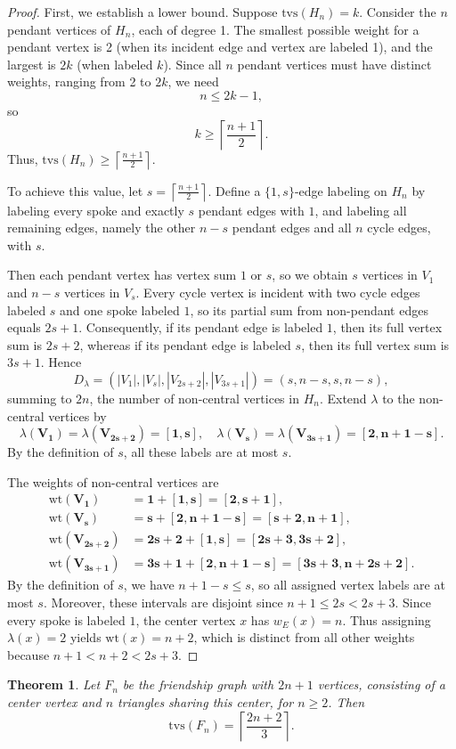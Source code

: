 \documentclass[11pt]{article}
\newtheorem{thm}{Theorem}[section]
\numberwithin{equation}{section}
\newcommand{\wt}{\mathrm{wt}}
\newcommand{\bv}[1]{\mathbf{#1}}
\begin{document}
\begin{proof}
First, we establish a lower bound. Suppose \(\mathrm{tvs}(H_n) = k\). Consider the \(n\) pendant vertices of \(H_n\), each of degree 1. The smallest possible weight for a pendant vertex is 2 (when its incident edge and vertex are labeled 1), and the largest is \(2k\) (when labeled \(k\)). Since all \(n\) pendant vertices must have distinct weights, ranging from 2 to \(2k\), we need
\[
n \leq 2k - 1,
\]
so
\[
k \geq \left\lceil \frac{n+1}{2} \right\rceil.
\]
Thus, \(\mathrm{tvs}(H_n) \geq \left\lceil \frac{n+1}{2} \right\rceil\).

To achieve this value, let \(s=\left\lceil \frac{n+1}{2}\right\rceil\). Define a \(\{1,s\}\)-edge labeling on \(H_n\) by labeling every spoke and exactly \(s\) pendant edges with \(1\), and labeling all remaining edges, namely the other \(n-s\) pendant edges and all \(n\) cycle edges, with \(s\).

Then each pendant vertex has vertex sum \(1\) or \(s\), so we obtain \(s\) vertices in \(V_1\) and \(n-s\) vertices in \(V_s\). Every cycle vertex is incident with two cycle edges labeled \(s\) and one spoke labeled \(1\), so its partial sum from non-pendant edges equals \(2s+1\). Consequently, if its pendant edge is labeled \(1\), then its full vertex sum is \(2s+2\), whereas if its pendant edge is labeled \(s\), then its full vertex sum is \(3s+1\). Hence
\[
D_\lambda = (|V_1|, |V_s|, |V_{2s+2}|, |V_{3s+1}|) = (s, n - s, s, n - s),
\]
summing to \(2n\), the number of non-central vertices in \(H_n\). Extend \(\lambda\) to the non-central vertices by
\[
\lambda(\bv{V_1}) = \lambda(\bv{V_{2s+2}}) = \bv{[1,s]}, \quad \lambda(\bv{V_s}) = \lambda(\bv{V_{3s+1}}) = \bv{[2,n+1-s]}.
\]
By the definition of \(s\), all these labels are at most \(s\).

The weights of non-central vertices are
\begin{align*}
\wt(\bv{V_1}) &= \bv{1} + \bv{[1,s]} = \bv{[2,s+1]}, \\
\wt(\bv{V_s}) &= \bv{s} + \bv{[2,n+1-s]} = \bv{[s+2,n+1]}, \\
\wt(\bv{V_{2s+2}}) &= \bv{2s+2} + \bv{[1,s]} = \bv{[2s+3,3s+2]}, \\
\wt(\bv{V_{3s+1}}) &= \bv{3s+1} + \bv{[2,n+1-s]} = \bv{[3s+3,n+2s+2]}.
\end{align*}
By the definition of \(s\), we have \(n+1-s\le s\), so all assigned vertex labels are at most \(s\). Moreover, these intervals are disjoint since \(n+1\le 2s<2s+3\). Since every spoke is labeled \(1\), the center vertex \(x\) has \(w_E(x)=n\). Thus assigning \(\lambda(x)=2\) yields \(\wt(x)=n+2\), which is distinct from all other weights because \(n+1<n+2<2s+3\).
\end{proof}
\begin{thm}\label{friendship}
Let \(F_n\) be the friendship graph with \(2n + 1\) vertices, consisting of a center vertex and \(n\) triangles sharing this center, for \(n \geq 2\). Then
\[
\mathrm{tvs}(F_n) = \left\lceil \frac{2n+2}{3} \right\rceil.
\]
\end{thm}
\end{document}
